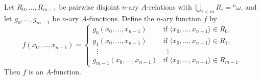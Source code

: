 Let $R_0, \ldots, R_{m-1}$ be pairwise disjoint $n$-ary $A$-relations with $\bigcup_{i < m} R_i = {}^n\omega$, and let $g_0, \ldots, g_{m-1}$ be $n$-ary $A$-functions. Define the $n$-ary function $f$ by
$$f(x_0, \ldots, x_{n-1}) = \begin{cases}
g_0(x_0, \ldots, x_{n-1}) & \text{if } \langle x_0, \ldots, x_{n-1} \rangle \in R_0, \\
g_1(x_0, \ldots, x_{n-1}) & \text{if } \langle x_0, \ldots, x_{n-1} \rangle \in R_1, \\
\;\;\vdots & \;\;\vdots \\
g_{m-1}(x_0, \ldots, x_{n-1}) & \text{if } \langle x_0, \ldots, x_{n-1} \rangle \in R_{m-1}.
\end{cases}$$
Then $f$ is an $A$-function.
